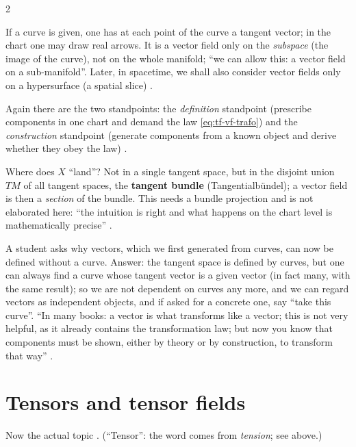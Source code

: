 \begin{paracol}{2}
\begin{example}\label{ex:tf-curve-field}
If a curve is given, one has at each point of the curve a tangent vector; in the chart one may draw real arrows. It is a vector
field only on the \emph{subspace} (the image of the curve), not on the whole manifold; ``we can allow this: a vector field on a
sub-manifold''. Later, in spacetime, we shall also consider vector fields only on a hypersurface (a spatial slice)
.
\end{example}
Again there are the two standpoints: the \emph{definition} standpoint (prescribe components in one chart and demand the law
\eqref{eq:tf-vf-trafo}) and the \emph{construction} standpoint (generate components from a known object and derive whether they
obey the law) .

\begin{secondary}
Where does $X$ ``land''? Not in a single tangent space, but in the disjoint union $TM$ of all tangent spaces, the \textbf{tangent
bundle} (Tangentialbündel); a vector field is then a \emph{section} of the bundle. This needs a bundle projection and is not
elaborated here: ``the intuition is right and what happens on the chart level is mathematically precise''
.
\end{secondary}
A student asks why vectors, which we first generated from curves, can now be defined without a curve. Answer: the tangent
space is defined by curves, but one can always find a curve whose tangent vector is a given vector (in fact many, with the
same result); so we are not dependent on curves any more, and we can regard vectors as independent objects, and if asked
for a concrete one, say ``take this curve''. ``In many books: a vector is what transforms like a vector; this is not very
helpful, as it already contains the transformation law; but now you know that components must be shown, either by theory or by
construction, to transform that way'' .

\section{Tensors and tensor fields}\label{sec:tf-tensors}

Now the actual topic . (``Tensor'': the word comes from \emph{tension}; see above.)


\end{paracol}
